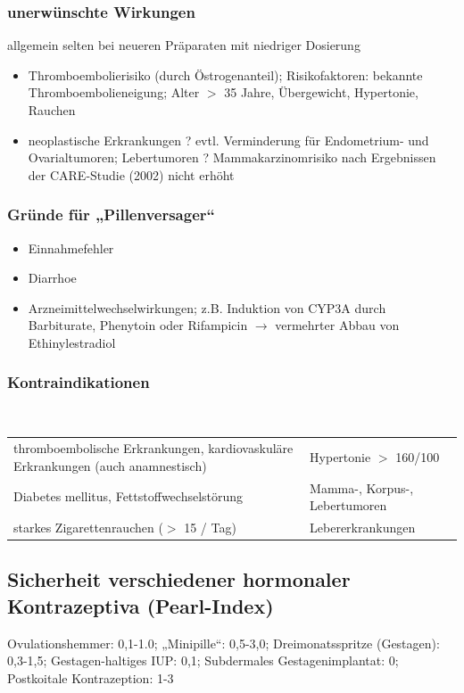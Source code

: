 \documentclass[10pt,a4paper]{report}
\begin{document}
\subsubsection{unerwünschte Wirkungen} %
\label{par:unerw_nschte_wirkungen}
allgemein selten bei neueren Präparaten mit niedriger Dosierung
\begin{itemize}
	\item Thromboembolierisiko (durch Östrogenanteil); 	Risikofaktoren: bekannte  Thromboembolieneigung; Alter $>$ 35 Jahre, Übergewicht, Hypertonie, Rauchen
	\item neoplastische Erkrankungen ? evtl. Verminderung für Endometrium- und Ovarialtumoren; Lebertumoren ? Mammakarzinomrisiko nach Ergebnissen der CARE-Studie (2002) nicht erhöht
\end{itemize}
\subsubsection{Gründe für „Pillenversager“} %
\label{par:gr_nde_f_r_pillenversager_}
\begin{itemize}
	\item Einnahmefehler 
	\item Diarrhoe
	\item Arzneimittelwechselwirkungen; z.B. Induktion von CYP3A durch Barbiturate, 
  	Phenytoin oder Rifampicin $\rightarrow$ vermehrter Abbau von Ethinylestradiol
\end{itemize}
\subsubsection{Kontraindikationen} %
\label{par:kontraindikationen}
\mbox{} \\
\begin{tabularx}{\textwidth}{XX}
thromboembolische Erkrankungen, kardiovaskuläre Erkrankungen (auch 	anamnestisch)&Hypertonie $>$ 160/100\\
Diabetes mellitus, Fettstoffwechselstörung&Mamma-, Korpus-, Lebertumoren\\
starkes Zigarettenrauchen ($>$ 15 / Tag)&Lebererkrankungen\\
\end{tabularx}
\subsection{Sicherheit verschiedener hormonaler Kontrazeptiva (Pearl-Index)} %
\label{sub:sicherheit_verschiedener_hormonaler_kontrazeptiva_pearl_index_}
Ovulationshemmer: 0,1-1.0; „Minipille“: 0,5-3,0; Dreimonatsspritze (Gestagen): 0,3-1,5; Gestagen-haltiges IUP: 0,1; Subdermales Gestagenimplantat: 0; Postkoitale Kontrazeption: 1-3
\end{document}
